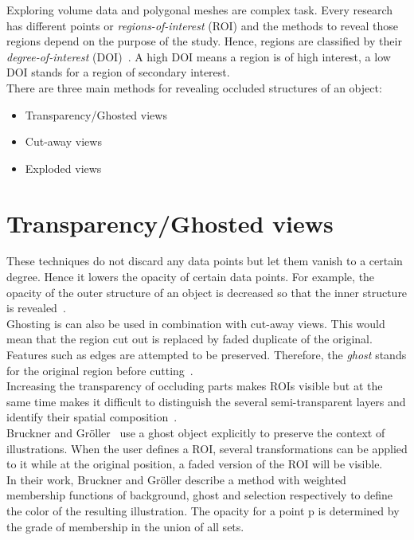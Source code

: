 
Exploring volume data and polygonal meshes are complex task. Every research has different points or \emph{regions-of-interest} (ROI) and the methods to reveal those regions depend on the purpose of the study. Hence, regions are classified by their \emph{degree-of-interest} (DOI)~\cite{proc:intelligentCutaway}. A high DOI means a region is of high interest, a low DOI stands for a region of secondary interest.\\
There are three main methods for revealing occluded structures of an object:
\begin{itemize}
	\item Transparency/Ghosted views
	\item Cut-away views
	\item Exploded views
\end{itemize}

\section{Transparency/Ghosted views}
These techniques do not discard any data points but let them vanish to a certain degree. Hence it lowers the opacity of certain data points. For example, the opacity of the outer structure of an object is decreased so that the inner structure is revealed~\cite{jour:correa}.\\
Ghosting is can also be used in combination with cut-away views. This would mean that the region cut out is replaced by faded duplicate of the original. Features such as edges are attempted to be preserved. Therefore, the \emph{ghost} stands for the original region before cutting~\cite{proc:volumeshop}.\\
Increasing the transparency of occluding parts makes ROIs visible but at the same time makes it difficult to distinguish the several semi-transparent layers and identify their spatial composition~\cite{jour:interactiveCutaway}.\\
Bruckner and Gr{\"o}ller~\cite{proc:volumeshop} use a ghost object explicitly to preserve the context of illustrations. When the user defines a ROI, several transformations can be applied to it while at the original position, a faded version of the ROI will be visible.\\
In their work, Bruckner and Gr{\"o}ller describe a method with weighted membership functions of background, ghost and selection respectively to define the color of the resulting illustration. The opacity for a point p is determined by the grade of membership in the union of all sets.

